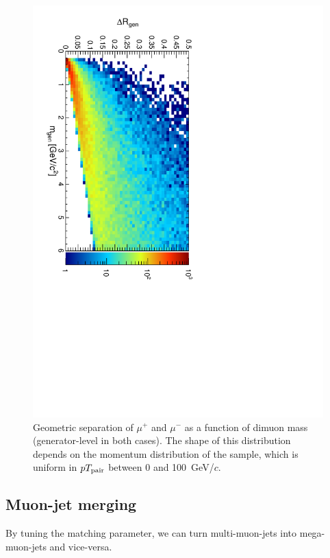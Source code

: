 \documentclass[12pt]{article}
\newcommand{\s}[1]{{\mbox{\scriptsize #1}}}
\begin{document}
\begin{figure}
\begin{center}
\includegraphics[height=0.5\linewidth, angle=90]{fig/acceptance2_plot/dr_vs_mass.pdf}
\end{center}
\caption{Geometric separation of $\mu^+$ and $\mu^-$ as a function of
  dimuon mass (generator-level in both cases).  The shape of this
  distribution depends on the momentum distribution of the sample,
  which is uniform in $pT_\s{pair}$ between 0 and
  100~GeV/$c$. \label{fig:dr_vs_mass}}
\end{figure}

\subsection{Muon-jet merging}

By tuning the matching parameter, we can turn multi-muon-jets into
mega-muon-jets and vice-versa.
\end{document}
